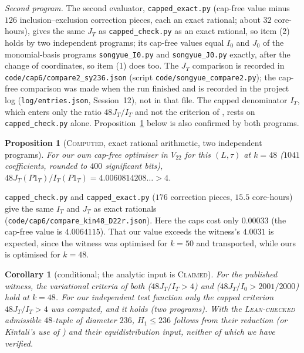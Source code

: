 \documentclass[11pt]{amsart}
\newtheorem{proposition}[theorem]{Proposition}
\newtheorem{corollary}[theorem]{Corollary}
\theoremstyle{definition}
\theoremstyle{remark}
\newcommand{\lbl}[1]{\textup{\textsc{#1}}}
\begin{document}
\emph{Second program.} The second evaluator,
\texttt{capped\_exact.py} (cap-free value minus $126$ inclusion--exclusion
correction pieces, each an exact rational; about $32$ core-hours), gives the
same $J_T$ as \texttt{capped\_check.py} as an exact rational, so item (2)
holds by two independent programs; its cap-free values equal $I_0$ and $J_0$
of the monomial-basis programs \texttt{songyue\_I0.py} and
\texttt{songyue\_J0.py} exactly, after the change of coordinates, so item (1)
does too. The $J_T$ comparison is recorded in
\texttt{code/}\allowbreak\texttt{cap6/}\allowbreak\texttt{compare2\_sy236.json}
(script \texttt{code/}\allowbreak\texttt{songyue\_compare2.py}); the cap-free
comparison was made when the run finished and is recorded in the project log
(\texttt{log/}\allowbreak\texttt{entries.json}, Session~12), not in that file.
The capped denominator $I_T$, which enters only the ratio $48J_T/I_T$ and not
the criterion of \cite{SY26}, rests on \texttt{capped\_check.py} alone.
Proposition~\ref{prop:kin-own} below is also confirmed by both programs.

\begin{proposition}[\lbl{Computed}, exact rational arithmetic, two independent programs]\label{prop:kin-own}
For our own cap-free optimiser in $V_{22}$ for this $(L,\tau)$ at $k=48$
($1041$ coefficients, rounded to $400$ significant bits),
$48J_T(P1_T)/I_T(P1_T)=4.0060814208\ldots>4$.
\end{proposition}

\texttt{capped\_check.py} and \texttt{capped\_exact.py} ($176$ correction
pieces, $15.5$ core-hours) give the same $I_T$ and $J_T$ as exact rationals
(\texttt{code/}\allowbreak\texttt{cap6/}\allowbreak\texttt{compare\_kin48\_D22r.json}).
Here the caps cost only $0.00033$ (the cap-free value is $4.0064115$). That our
value exceeds the witness's $4.0031$ is expected, since the witness was
optimised for $k=50$ and transported, while ours is optimised for $k=48$.

\begin{corollary}[conditional; the analytic input is \lbl{Claimed}]
For the published witness, the variational criteria of both \cite{Kin26}
($48J_T/I_T>4$) and \cite{SY26} ($48J_T/I_0>2001/2000$) hold at $k=48$. For
our independent test function only the capped criterion $48J_T/I_T>4$ was
computed, and it holds (two programs). With the
\lbl{Lean-checked} admissible $48$-tuple of diameter $236$, $H_1\le236$
follows from their reduction \cite[Thm.~4.33]{SY26} (or Kintali's use of
\cite[Prop.~1]{Sta26}) and their equidistribution input, neither of which we
have verified.
\end{corollary}
\end{document}
